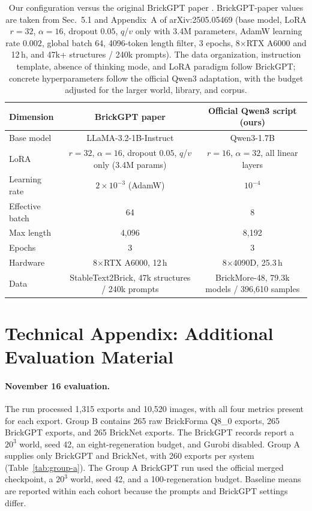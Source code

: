 \documentclass[letterpaper]{article} %
\begin{document}
\begin{table}[!htbp]
\centering
\small
\setlength{\tabcolsep}{5pt}
\begin{tabular}{lcc}
\toprule
Dimension & BrickGPT paper & Official Qwen3 script (ours) \\
\midrule
Base model & LLaMA-3.2-1B-Instruct & Qwen3-1.7B \\
LoRA & $r=32$, $\alpha=16$, dropout $0.05$, $q$/$v$ only (3.4M params) & $r=16$, $\alpha=32$, all linear layers \\
Learning rate & $2{\times}10^{-3}$ (AdamW) & $10^{-4}$ \\
Effective batch & 64 & 8 \\
Max length & 4,096 & 8,192 \\
Epochs & 3 & 3 \\
Hardware & 8$\times$RTX A6000, 12\,h & 8$\times$4090D, 25.3\,h \\
Data & StableText2Brick, 47k structures / 240k prompts & BrickMore-48, 79.3k models / 396,610 samples \\
\bottomrule
\end{tabular}
\caption{Our configuration versus the original BrickGPT paper \cite{brickgpt}. BrickGPT-paper values are taken from Sec.~5.1 and Appendix~A of arXiv:2505.05469 (base model, LoRA $r{=}32$, $\alpha{=}16$, dropout $0.05$, $q$/$v$ only with 3.4M parameters, AdamW learning rate $0.002$, global batch 64, 4096-token length filter, 3 epochs, 8$\times$RTX A6000 and 12\,h, and 47k+ structures / 240k prompts). The data organization, instruction template, absence of thinking mode, and LoRA paradigm follow BrickGPT; concrete hyperparameters follow the official Qwen3 adaptation, with the budget adjusted for the larger world, library, and corpus.}
\label{tab:brickgpt-recipe}
\end{table}


\section{Technical Appendix: Additional Evaluation Material}
\label{app:eval}

\paragraph{November 16 evaluation.}
The run processed 1,315 exports and 10,520 images, with all four metrics present for each export. Group B contains 265 raw BrickForma Q8\_0 exports, 265 BrickGPT exports, and 265 BrickNet exports. The BrickGPT records report a $20^3$ world, seed 42, an eight-regeneration budget, and Gurobi disabled. Group A supplies only BrickGPT and BrickNet, with 260 exports per system (Table~\ref{tab:group-a}). The Group A BrickGPT run used the official merged checkpoint, a $20^3$ world, seed 42, and a 100-regeneration budget. Baseline means are reported within each cohort because the prompts and BrickGPT settings differ.

\end{document}
